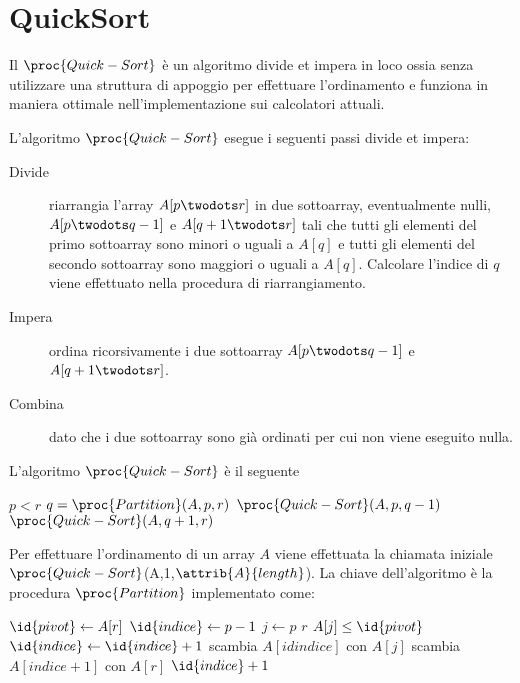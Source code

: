 \chapter{QuickSort}
Il $\proc{Quick-Sort}$ è un algoritmo divide et impera in loco ossia senza utilizzare
una struttura di appoggio per effettuare l'ordinamento e funziona in maniera ottimale
nell'implementazione sui calcolatori attuali.

L'algoritmo $\proc{Quick-Sort}$ esegue i seguenti passi divide et impera:
\begin{description}
  \item[Divide] riarrangia l'array $A[p\twodots r]$ in due sottoarray, eventualmente nulli,
                $A[p \twodots q-1]$ e $A[q+1 \twodots r]$ tali che tutti gli elementi
                del primo sottoarray sono minori o uguali a $A[q]$ e tutti gli elementi
                del secondo sottoarray sono maggiori o uguali a $A[q]$.\newline
                Calcolare l'indice di $q$ viene effettuato nella procedura di riarrangiamento.
  \item[Impera] ordina ricorsivamente i due sottoarray $A[p \twodots q-1]$ e $A[q+1 \twodots r]$.
  \item[Combina] dato che i due sottoarray sono già ordinati per cui non viene eseguito nulla.
\end{description}

L'algoritmo $\proc{Quick-Sort}$ è il seguente
\begin{codebox}
\li \If $p < r$
    \Then
\li           $q = \proc{Partition}(A,p,r)$
\li           $\proc{Quick-Sort}(A,p,q-1)$
\li           $\proc{Quick-Sort}(A,q+1,r)$
    \End
\end{codebox}
Per effettuare l'ordinamento di un array $A$ viene effettuata la chiamata iniziale
$\proc{Quick-Sort}$(A,1,$\attrib{A}{length}$).\newline
La chiave dell'algoritmo è la procedura $\proc{Partition}$ implementato come:
\begin{codebox}
\li $\id{pivot} \gets A[r]$
\li $\id{indice} \gets p-1$
\li \For $j \gets p$ \To $r$
    \Do
\li               \If $A[j] \leq \id{pivot}$
                  \Then
\li                              $\id{indice} \gets \id{indice} + 1$
\li                              scambia $A[id{indice}]$ con $A[j]$
                  \End
    \End
\li scambia $A[indice+1]$ con $A[r]$
\li \Return $\id{indice} + 1$
\end{codebox}

